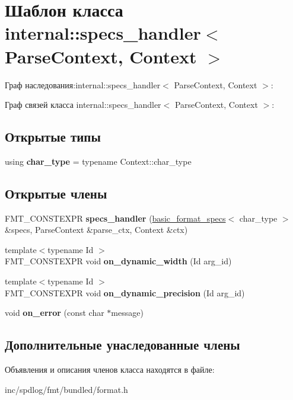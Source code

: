 \hypertarget{classinternal_1_1specs__handler}{}\section{Шаблон класса internal\+:\+:specs\+\_\+handler$<$ Parse\+Context, Context $>$}
\label{classinternal_1_1specs__handler}


Граф наследования\+:internal\+:\+:specs\+\_\+handler$<$ Parse\+Context, Context $>$\+:


Граф связей класса internal\+:\+:specs\+\_\+handler$<$ Parse\+Context, Context $>$\+:
\subsection*{Открытые типы}
\begin{DoxyCompactItemize}
\item 
\mbox{\label{classinternal_1_1specs__handler_a051a9a1eb82d8cd0937d1cc523898c9a}} 
using {\bfseries char\+\_\+type} = typename Context\+::char\+\_\+type
\end{DoxyCompactItemize}
\subsection*{Открытые члены}
\begin{DoxyCompactItemize}
\item 
\mbox{\label{classinternal_1_1specs__handler_a118acc19cd6553a0d01e8f7e72e9afeb}} 
F\+M\+T\+\_\+\+C\+O\+N\+S\+T\+E\+X\+PR {\bfseries specs\+\_\+handler} (\hyperlink{structbasic__format__specs}{basic\+\_\+format\+\_\+specs}$<$ char\+\_\+type $>$ \&specs, Parse\+Context \&parse\+\_\+ctx, Context \&ctx)
\item 
\mbox{\label{classinternal_1_1specs__handler_a9d62c2106eb7004d19a4fcc9889bb2da}} 
{\footnotesize template$<$typename Id $>$ }\\F\+M\+T\+\_\+\+C\+O\+N\+S\+T\+E\+X\+PR void {\bfseries on\+\_\+dynamic\+\_\+width} (Id arg\+\_\+id)
\item 
\mbox{\label{classinternal_1_1specs__handler_a347c2a44068ccbab671469863a486786}} 
{\footnotesize template$<$typename Id $>$ }\\F\+M\+T\+\_\+\+C\+O\+N\+S\+T\+E\+X\+PR void {\bfseries on\+\_\+dynamic\+\_\+precision} (Id arg\+\_\+id)
\item 
\mbox{\label{classinternal_1_1specs__handler_a722dc4a4607a38cddccbf61946108416}} 
void {\bfseries on\+\_\+error} (const char $\ast$message)
\end{DoxyCompactItemize}
\subsection*{Дополнительные унаследованные члены}


Объявления и описания членов класса находятся в файле\+:\begin{DoxyCompactItemize}
\item 
inc/spdlog/fmt/bundled/format.\+h\end{DoxyCompactItemize}
